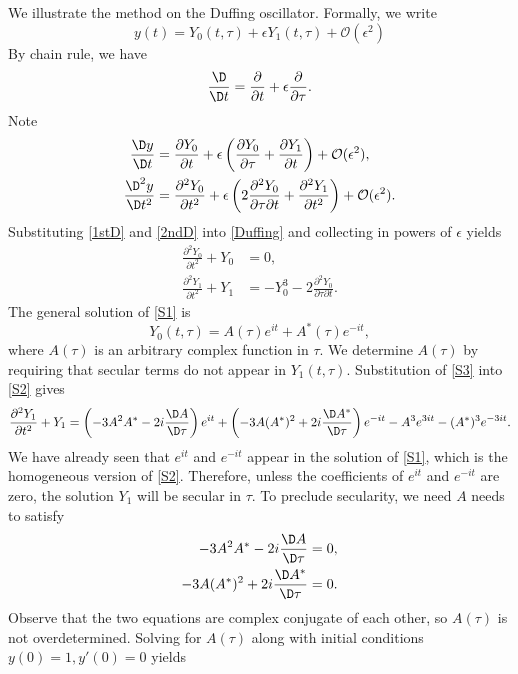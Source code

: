 We illustrate the method on the Duffing oscillator. Formally, we write
\[ y(t) = Y_0(t, \tau) + \epsilon Y_1(t, \tau) + \mathcal{O}(\epsilon^2) \]
By chain rule, we have
\[ \frac{\D}{\D t} = \frac{\partial}{\partial t} + \epsilon \frac{\partial}{\partial \tau}. \]
Note
\begin{align}
\frac{\D y}{\D t} &= \frac{\partial Y_0}{\partial t} + \epsilon \left( \frac{\partial Y_0}{\partial \tau} + \frac{\partial Y_1}{\partial t} \right) + \mathcal{O}(\epsilon^2), \label{1stD} \\
\frac{\D^2 y}{\D t^2} &=\frac{\partial^2 Y_0}{\partial t^2} + \epsilon \left( 2 \frac{\partial^2 Y_0}{\partial \tau \partial t} + \frac{\partial^2 Y_1}{\partial t^2} \right) + \mathcal{O}(\epsilon^2). \label{2ndD}
\end{align}
Substituting \eqref{1stD} and \eqref{2ndD} into \eqref{Duffing} and collecting in powers of $\epsilon$ yields
\begin{align}
\frac{\partial^2 Y_0}{\partial t^2} + Y_0 &= 0, \label{S1}\\
\frac{\partial^2 Y_1}{\partial t^2} + Y_1 &= - Y_0^3 - 2 \frac{\partial^2 Y_0}{\partial \tau \partial t}. \label{S2}
\end{align}
The general solution of \eqref{S1} is 
\begin{equation}\label{S3}
Y_0(t, \tau) = A(\tau) e^{it} + A^*(\tau) e^{-it},
\end{equation}
where $A(\tau)$ is an arbitrary complex function in $\tau.$ We determine $A(\tau)$ by requiring that secular terms do not appear in $Y_1(t, \tau).$ Substitution of \eqref{S3} into \eqref{S2} gives
\begin{equation}\label{S4}
\frac{\partial^2 Y_1}{\partial t^2} + Y_1 =  \left(-3 A^2 A^* - 2i \frac{\D A}{\D \tau}\right) e^{it} + \left(-3 A (A^*)^2 + 2i \frac{\D A^*}{\D \tau}\right) e^{-it}  - A^3 e^{3it}  - (A^*)^3 e^{-3it}.
\end{equation}
We have already seen that $e^{it}$ and $e^{-it}$ appear in the solution of \eqref{S1}, which is the homogeneous version of \eqref{S2}. Therefore, unless the coefficients of $e^{it}$ and $e^{-it}$ are zero, the solution $Y_1$ will be secular in $\tau.$  To preclude secularity, we need $A$ needs to satisfy
\begin{align*}
-3 A^2 A^* - 2i \frac{\D A}{\D \tau} &= 0, \\
-3 A (A^*)^2 + 2i \frac{\D A^*}{\D \tau} &= 0.
\end{align*}
Observe that the two equations are complex conjugate of each other, so $A(\tau)$ is not overdetermined. Solving for $A(\tau)$ along with initial conditions $y(0)=1, y'(0)=0$ yields 
